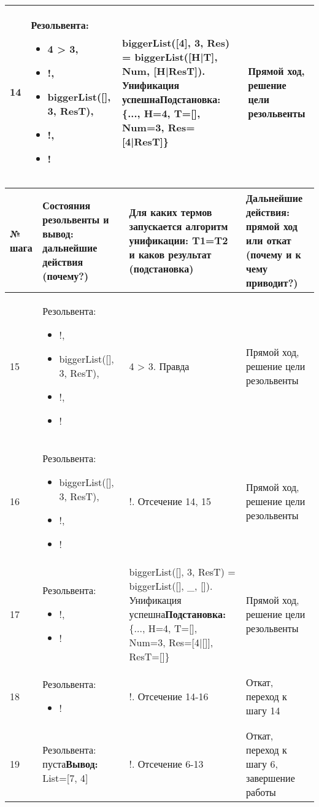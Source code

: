 \documentclass[14pt,a4paper]{scrreprt}
\begin{document}
\begin{table}[H]
\begin{tabular}{|p{0.8cm\small}|p{4.7cm\small}|p{5.7cm\small}|p{4cm\small}|}
		\hline
		14 & Резольвента: \begin{itemize} \item 4 > 3, \item !, \item biggerList([], 3, ResT), \item !, \item ! \end{itemize} & biggerList([4], 3, Res) = biggerList([H|T], Num, [H|ResT]). Унификация успешна\linebreak \textbf{Подстановка:} \{..., H=4, T=[], Num=3, Res=[4|ResT]\} & Прямой ход, решение цели резольвенты\\
		\hline
	\end{tabular}
\end{table}

\begin{table}[H]
	\begin{tabular}{|p{0.8cm\small}|p{4.7cm\small}|p{5.7cm\small}|p{4cm\small}|}	
		\hline
		№ шага & Состояния резольвенты и вывод: дальнейшие действия (почему?) & Для каких термов запускается алгоритм унификации: T1=T2 и каков результат (подстановка) & Дальнейшие действия: прямой ход или откат (почему и к чему приводит?)\\
		\hline
		15 & Резольвента: \begin{itemize} \item !, \item biggerList([], 3, ResT), \item !, \item ! \end{itemize} & 4 > 3. Правда & Прямой ход, решение цели резольвенты\\
		\hline
		16 & Резольвента: \begin{itemize} \item biggerList([], 3, ResT), \item !, \item ! \end{itemize} & !. Отсечение 14, 15 & Прямой ход, решение цели резольвенты\\
		\hline
		17 & Резольвента: \begin{itemize} \item !, \item ! \end{itemize} & biggerList([], 3, ResT) = biggerList([], \_, []). Унификация успешна\linebreak \textbf{Подстановка:} \{..., H=4, T=[], Num=3, Res=[4|[]], ResT=[]\} & Прямой ход, решение цели резольвенты\\
		\hline
		18 & Резольвента: \begin{itemize} \item ! \end{itemize} & !. Отсечение 14-16 & Откат, переход к шагу 14\\
		\hline
		19 & Резольвента: пуста\linebreak \textbf{Вывод:} List=[7, 4] & !. Отсечение 6-13 & Откат, переход к шагу 6, завершение работы\\
		\hline
	\end{tabular}
\end{table}
		
\end{document}
